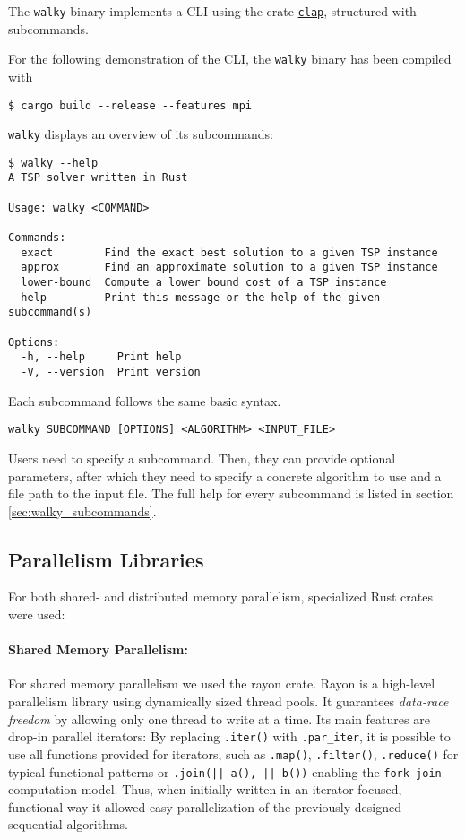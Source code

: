 The \texttt{walky} binary implements a \ac{CLI} using the crate \href{https://crates.io/crates/clap}{\texttt{clap}},
structured with subcommands.

For the following demonstration of the \ac{CLI},
the \texttt{walky} binary has been compiled with
\begin{verbatim}
$ cargo build --release --features mpi
\end{verbatim}

\texttt{walky} displays an overview of its subcommands:
\begin{verbatim}
$ walky --help
A TSP solver written in Rust

Usage: walky <COMMAND>

Commands:
  exact        Find the exact best solution to a given TSP instance
  approx       Find an approximate solution to a given TSP instance
  lower-bound  Compute a lower bound cost of a TSP instance
  help         Print this message or the help of the given subcommand(s)

Options:
  -h, --help     Print help
  -V, --version  Print version
\end{verbatim}

Each subcommand follows the same basic syntax.

\begin{verbatim}
walky SUBCOMMAND [OPTIONS] <ALGORITHM> <INPUT_FILE>
\end{verbatim}

Users need to specify a subcommand. Then, they can provide optional parameters, after which
they need to specify a concrete algorithm to use and a file path to the input file.
The full help for every subcommand is listed in section \ref{sec:walky_subcommands}.

\subsection{Parallelism Libraries}
\label{sec:parallelism_libraries}
For both shared- and distributed memory parallelism, specialized Rust crates were used:

\paragraph{Shared Memory Parallelism:} For shared memory parallelism we used the rayon \cite{noauthor_rayon_2023} crate. Rayon is a high-level parallelism library using dynamically sized thread pools. It guarantees \emph{data-race freedom} by allowing only one thread to write at a time. Its main features are drop-in parallel iterators: By replacing \texttt{.iter()} with \texttt{.par\_iter}, it is possible to use all functions provided for iterators, such as \texttt{.map()}, \texttt{.filter()}, \texttt{.reduce()} for typical functional patterns or \texttt{.join(|| a(), || b())} enabling the \texttt{fork-join} computation model. Thus, when initially written in an iterator-focused, functional way it allowed easy parallelization of the previously designed sequential algorithms.

